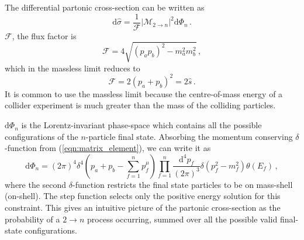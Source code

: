 \documentclass[main.tex]{subfiles}
\begin{document}
    The differential partonic cross-section can be written as
    \begin{equation}\label{eqn:dsigma}
        \mathrm{d}\hat{\sigma} = \dfrac{1}{\mathcal{F}}|\mathcal{M}_{2 \rightarrow n}|^{2} \mathrm{d}\Phi_{n} \, .
    \end{equation}
    $\mathcal{F}$, the flux factor is
    \begin{equation}\label{eqn:flux}
        \mathcal{F} = 4\sqrt{(p_{a}p_{b})^{2} - m_{a}^{2}m_{b}^{2}} \, ,
    \end{equation}
    which in the massless limit reduces to
    \begin{equation}\label{eqn:massless_flux}
        \mathcal{F} = 2(p_{a} + p_{b})^{2} = 2\hat{s} \, .
    \end{equation}
    It is common to use the massless limit because
    the centre-of-mass energy of a collider
    experiment is much greater than the mass
    of the colliding particles.

    $\mathrm{d}\Phi_{n}$ is the Lorentz-invariant
    phase-space which contains all the possible
    configurations of the $n$-particle final state.
    Absorbing the momentum conserving $\delta$-function
    from (\ref{eqn:matrix_element}),
    we can write it as
    \begin{equation}\label{eqn:dlips_4d}
        \mathrm{d}\Phi_{n} = (2\pi)^{4}\delta^{4}\left(p_{a} + p_{b} - \sum_{f=1}^{n} p_{f}^{\mu}\right) \prod_{f=1}^{n} \dfrac{\mathrm{d}^{4}p_{f}}{(2\pi)^{3}}\delta(p_{f}^{2} - m_{f}^{2})\theta(E_{f}) \, ,
    \end{equation}
    where the second $\delta$-function restricts
    the final state particles to be on mass-shell
    (on-shell). The step function selects only
    the positive energy solution for this constraint.
    This gives an intuitive picture of the partonic
    cross-section as the probability of a $2\rightarrow n$
    process occurring, summed over all the possible
    valid final-state configurations.
\end{document}
